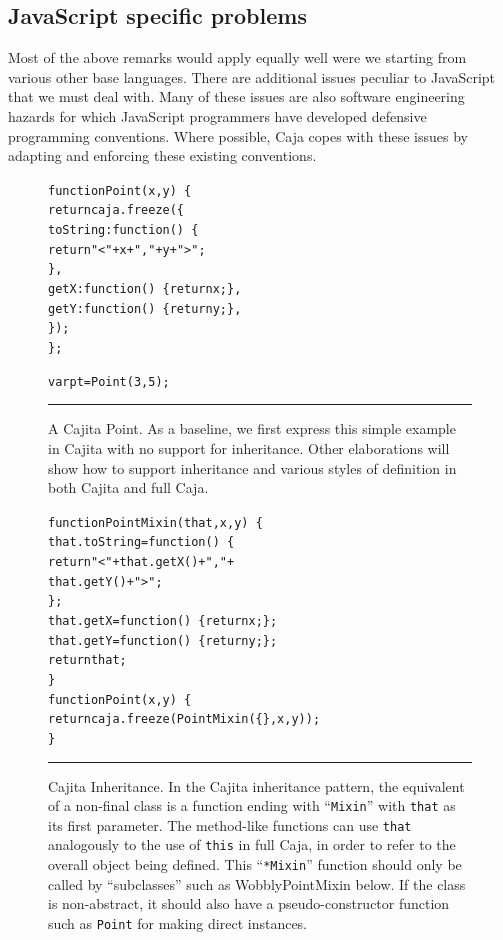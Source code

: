 \documentclass[letterpaper,twocolumn,10pt]{article}
\newcommand{\code}[1]{{\tt {#1}}}              %
\begin{document}
\subsection{JavaScript specific problems}

Most of the above remarks would apply equally well were we starting from 
various other base languages. There are additional issues peculiar to 
JavaScript that we must deal with. Many of these issues are also software 
engineering hazards for which JavaScript programmers have developed 
defensive programming conventions. Where possible, Caja copes with these 
issues by adapting and enforcing these existing conventions.

\begin{figure}[t!]
\begin{alltt}
function Point(x, y)\ \{
  return caja.freeze(\{
    toString: function()\ \{ 
      return "<" + x + "," + y + ">"; 
    \},
    getX: function()\ \{ return x; \},
    getY: function()\ \{ return y; \},
  \});
\};

var pt = Point(3, 5);
\end{alltt}

\caption[A Cajita Point.]{A Cajita Point. As a baseline, we first express 
this simple example in Cajita with no support for inheritance. Other 
elaborations will show how to support inheritance and various styles of 
definition in both Cajita and full Caja. 
\\ } \hrule
\label{fig:cajita-point}
\end{figure}

\begin{figure}[t!]
\begin{alltt}
function PointMixin(that, x, y)\ \{
  that.toString = function()\ \{ 
    return "<" + that.getX() + "," + 
                 that.getY() + ">"; 
  \};
  that.getX = function()\ \{ return x; \};
  that.getY = function()\ \{ return y; \};
  return that;
\}
function Point(x, y)\ \{
  return caja.freeze(PointMixin(\{\}, x, y));
\}
\end{alltt}

\caption[Cajita Inheritance.]{Cajita Inheritance. In the Cajita inheritance 
pattern, the equivalent of a non-final class is a function ending with 
``\code{Mixin}'' with \code{that} as its first parameter. The method-like 
functions can use \code{that} analogously to the use of \code{this} in full 
Caja, in order to refer to the overall object being defined. This 
``\code{*Mixin}'' function should only be called by ``subclasses'' such as 
WobblyPointMixin below. If the class is non-abstract, it should also have a 
pseudo-constructor function such as \code{Point} for making direct 
instances. \\ } \hrule
\label{fig:cajita-super-point}
\end{figure}
\end{document}
